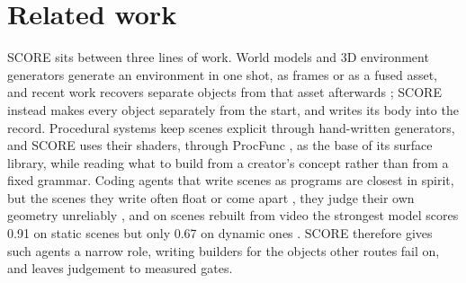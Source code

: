 \section{Related work}\label{related-work}

SCORE sits between three lines of work. World models \citep{bruce2024genie, genie3} and 3D environment generators \citep{wang2025worldgen, hyworld2} generate an environment in one shot, as frames or as a fused asset, and recent work recovers separate objects from that asset afterwards \citep{hu2026worldact, niu2026worldsculpt}; SCORE instead makes every object separately from the start, and writes its body into the record. Procedural systems \citep{raistrick2023infinigen, raistrick2024indoors} keep scenes explicit through hand-written generators, and SCORE uses their shaders, through ProcFunc \citep{raistrick2026procfunc}, as the base of its surface library, while reading what to build from a creator's concept rather than from a fixed grammar. Coding agents that write scenes as programs \citep{hu2024scenecraft, li2026rcwm, guo2026worldclaw, yin2026autoue, he2026thinking, wang2026codeasworlds} are closest in spirit, but the scenes they write often float or come apart \citep{gao2026codebench3d}, they judge their own geometry unreliably \citep{li2026lego}, and on scenes rebuilt from video the strongest model scores 0.91 on static scenes but only 0.67 on dynamic ones \citep{shen2026codebench4d}. SCORE therefore gives such agents a narrow role, writing builders for the objects other routes fail on, and leaves judgement to measured gates.
